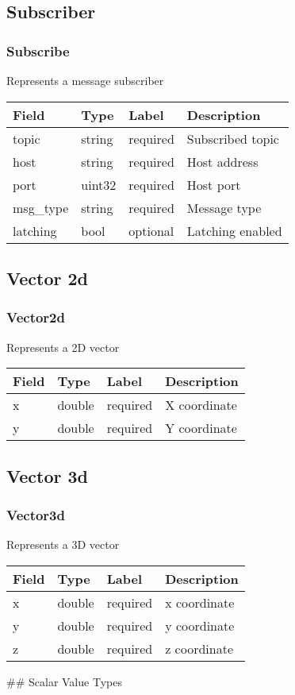 \subsection{Subscriber}\label{subscribe.proto}
\subsubsection*{Subscribe} Represents a message subscriber
\begin{longtable}[l]{@{}llll@{}}
\toprule
Field & Type & Label & Description\tabularnewline
\midrule
\endhead
topic & string & required & Subscribed topic\tabularnewline
host & string & required & Host address\tabularnewline
port & uint32 & required & Host port\tabularnewline
msg\_type & string & required & Message type\tabularnewline
latching & bool & optional & Latching enabled\tabularnewline
\bottomrule
\end{longtable}
\subsection{Vector 2d}\label{vector2d.proto}
\subsubsection*{Vector2d} Represents a 2D vector
\begin{longtable}[l]{@{}llll@{}}
\toprule
Field & Type & Label & Description\tabularnewline
\midrule
\endhead
x & double & required & X coordinate\tabularnewline
y & double & required & Y coordinate\tabularnewline
\bottomrule
\end{longtable}
\subsection{Vector 3d}\label{vector3d.proto}
\subsubsection*{Vector3d} Represents a 3D vector
\begin{longtable}[l]{@{}llll@{}}
\toprule
Field & Type & Label & Description\tabularnewline
\midrule
\endhead
x & double & required & x coordinate\tabularnewline
y & double & required & y coordinate\tabularnewline
z & double & required & z coordinate\tabularnewline
\bottomrule
\end{longtable}

 \#\# Scalar Value Types


